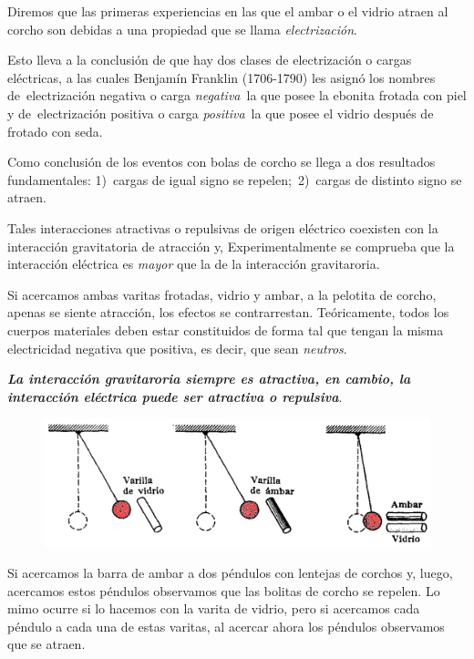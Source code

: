 Diremos que las primeras experiencias en las que el ambar o el vidrio atraen al corcho son debidas a una propiedad que se llama \emph{electrización}.

Esto lleva a la conclusión de que hay dos clases de electrización o cargas eléctricas, a las cuales Benjamín Franklin (1706-1790) les asignó los nombres de electrización negativa o carga \emph{negativa} la que posee la ebonita frotada con piel y de electrización positiva o carga \emph{positiva} la que posee el vidrio después de frotado con seda.

Como conclusión de los eventos con bolas de corcho se llega a dos resultados fundamentales: 1) cargas de igual signo se repelen; 2) cargas de distinto signo se atraen.

Tales interacciones atractivas o repulsivas de origen eléctrico coexisten con la interacción gravitatoria de atracción y, Experimentalmente se comprueba que la interacción eléctrica es \emph{mayor} que la de la interacción gravitaroria.

Si acercamos ambas varitas frotadas, vidrio y ambar, a la pelotita de corcho, apenas se siente atracción, los efectos se contrarrestan. Teóricamente, todos los cuerpos materiales deben estar constituidos de forma tal que tengan la misma electricidad negativa que positiva, es decir, que sean \emph{neutros}.

\begin{miparrafodestacado}
	\textbf{\emph{La interacción gravitaroria siempre es atractiva, en cambio, la interacción eléctrica puede ser atractiva o repulsiva}}.
\end{miparrafodestacado}

\begin{figure}[H]
		\centering
		\includegraphics[width=1\textwidth]{imagenes/imagenes22/T22IM03.png}
	\end{figure}

Si acercamos la barra de ambar a dos péndulos con lentejas de corchos y, luego, acercamos estos péndulos observamos que las bolitas de corcho se repelen. Lo mimo ocurre si lo hacemos con la varita de vidrio, pero si acercamos cada péndulo a cada una de estas varitas, al acercar ahora los péndulos observamos que se atraen.

